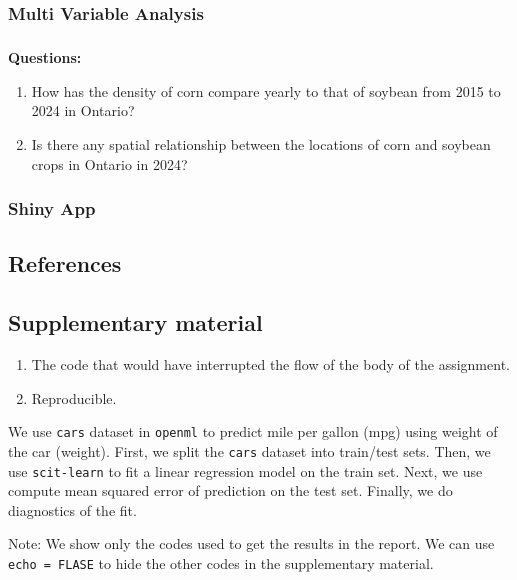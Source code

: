 \documentclass[
  11pt,
  letterpaper,
  DIV=11,
  numbers=noendperiod]{scrartcl}
\makeatletter
\let\oldsubparagraph\subparagraph
\renewcommand{\subparagraph}{
    \@ifstar
      \xxxSubParagraphStar
      \xxxSubParagraphNoStar
  }
\newcommand{\xxxSubParagraphStar}[1]{\oldsubparagraph*{#1}\mbox{}}
\newcommand{\xxxSubParagraphNoStar}[1]{\oldsubparagraph{#1}\mbox{}}
\providecommand{\tightlist}{%
  \setlength{\itemsep}{0pt}\setlength{\parskip}{0pt}}
\makeatother
\begin{document}
\subsubsection{Multi Variable Analysis}\label{multi-variable-analysis}

\subparagraph{\texorpdfstring{\textbf{Questions:}}{Questions:}}\label{questions-1}

\begin{enumerate}
\def\labelenumi{\arabic{enumi}.}
\tightlist
\item
  How has the density of corn compare yearly to that of soybean from
  2015 to 2024 in Ontario?
\item
  Is there any spatial relationship between the locations of corn and
  soybean crops in Ontario in 2024?
\end{enumerate}

\subsubsection{Shiny App}\label{shiny-app}

\newpage

\subsection{References}\label{references}

\newpage

\subsection{Supplementary material}\label{supplementary-material}

\begin{enumerate}
\def\labelenumi{\arabic{enumi}.}
\item
  The code that would have interrupted the flow of the body of the
  assignment.
\item
  Reproducible.
\end{enumerate}

We use \texttt{cars} dataset in \texttt{openml} to predict mile per
gallon (mpg) using weight of the car (weight). First, we split the
\texttt{cars} dataset into train/test sets. Then, we use
\texttt{scit-learn} to fit a linear regression model on the train set.
Next, we use compute mean squared error of prediction on the test set.
Finally, we do diagnostics of the fit.

Note: We show only the codes used to get the results in the report. We
can use \texttt{echo\ =\ FLASE} to hide the other codes in the
supplementary material.
\end{document}
